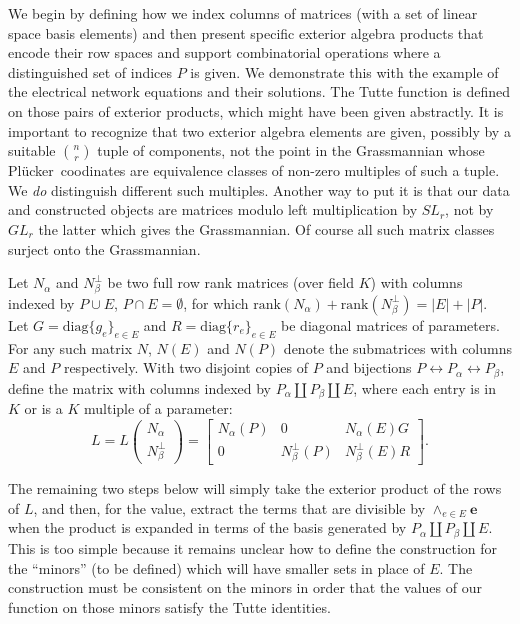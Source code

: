 \documentclass[Unicode]{cedram-alco}
\newcommand{\ext}[1]{\ensuremath{\mathbf{#1}}}
\newcommand{\Plucker}{Pl\"{u}cker\ }
\newcommand{\Nal}{\ensuremath{N_{\alpha}}}
\newcommand{\NbePe}{\ensuremath{N_{\beta}^{\perp}}}
\newcommand{\dunion}{\coprod}
\begin{document}
\noindent
We begin by defining how we index columns of matrices (with a set of
linear space basis elements) and then
present specific
exterior algebra products that encode their row spaces and support
combinatorial operations where a distinguished set of indices $P$ is given.
We demonstrate this with the example
of the electrical network equations and their solutions.
The Tutte function is defined
on those pairs of exterior products, which might have been given abstractly.
It is important to recognize that two exterior algebra elements are given,
possibly by a suitable $\binom{n}{r}$ tuple of components, not the point in the Grassmannian
whose \Plucker coodinates are equivalence classes of non-zero multiples of
such a tuple.  We \emph{do} distinguish different such multiples.  Another way
to put it is that our data and constructed objects are matrices modulo left multiplication
by $SL_r$, not by $GL_r$ the latter which gives the Grassmannian.  Of course all such matrix
classes surject onto the Grassmannian.



Let $\Nal$ and $\NbePe$ be two full row rank matrices (over field $K$)
with
columns indexed by $P\cup E$, $P\cap E=\emptyset$, for which
$\text{rank}(\Nal)+\text{rank}(\NbePe)=|E|+|P|$.  Let
$G=\text{diag}\{g_e\}_{e\in E} $ and $R=\text{diag}\{r_e\}_{e\in E} $
be diagonal matrices of parameters.  For any such matrix $N$, $N(E)$ and
$N(P)$ denote the submatrices with columns $E$ and $P$ respectively. With
two disjoint copies of $P$ and bijections
$P \leftrightarrow P_{\alpha}\leftrightarrow P_{\beta}$, define the matrix
with columns indexed by $P_\alpha \dunion P_\beta \dunion E$, where each entry
is in $K$ or is a $K$ multiple of a parameter:
\[
    L = L\left( \begin{array}{c} \Nal\\ \NbePe \end{array} \right)
    = \left[\begin{array}{c|c|c} \Nal(P)  &  0  &  \Nal(E)G \\  \hline
        0  & \NbePe(P)  &  \NbePe(E)R \end{array}\right].
\]

The remaining two steps below will simply take the exterior product of the rows of $L$, and
then, for the value, extract the terms that are divisible by $\wedge_{e \in E}\ext{e}$ when the product
is expanded in terms of the basis generated by $P_\alpha \dunion P_\beta \dunion E$.
This is too simple because it remains unclear how to define the construction for the
``minors'' (to be defined) which will have smaller sets in place of $E$. The
construction must be consistent on the minors in order that the values
of our function on those minors satisfy the Tutte identities. 
\end{document}
